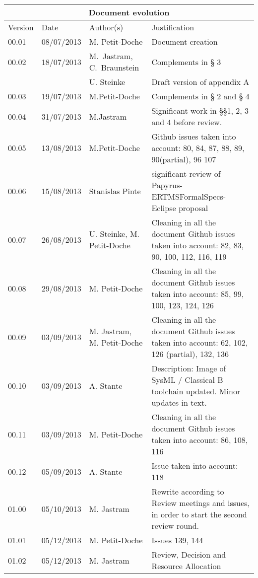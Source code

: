 \documentclass{template/openetcs_report}
\begin{document}
\begin{tabular}{|p{2.2cm}|p{2cm}|p{3cm}|p{5cm}|}
\hline
\multicolumn{4}{|c|}{Document evolution} \\
\hline
Version &  Date & Author(s) & Justification  \\
\hline  
00.01 & 08/07/2013 & M. Petit-Doche &  Document creation  \\
00.02 & 18/07/2013 & M.~Jastram, C.~Braunstein & Complements in § 3 \\
 &  & U. Steinke & Draft version of appendix A \\
00.03 & 19/07/2013 & M.Petit-Doche & Complements in § 2 and § 4 \\
00.04 & 31/07/2013 & M.Jastram & Significant work in §§1, 2, 3 and 4 before review. \\
00.05 & 13/08/2013 & M.Petit-Doche & Github issues taken into account: 80, 84, 87, 88, 89, 90(partial), 96 107 \\
00.06 & 15/08/2013 & Stanislas Pinte & significant review of Papyrus-ERTMSFormalSpecs-Eclipse proposal \\
00.07 & 26/08/2013 & U. Steinke, M. Petit-Doche & Cleaning in all the document Github issues taken into account: 82, 83, 90, 100, 112, 116, 119 \\
00.08 & 29/08/2013 &  M. Petit-Doche & Cleaning in all the document Github issues taken into account: 85, 99, 100, 123, 124, 126 \\
00.09 & 03/09/2013 & M. Jastram,  M. Petit-Doche & Cleaning in all the document Github issues taken into account: 62, 102, 126 (partial), 132, 136 \\
00.10 & 03/09/2013 & A. Stante & Description: Image of SysML / Classical B toolchain updated. Minor updates in text. \\
00.11 & 03/09/2013 &  M. Petit-Doche & Cleaning in all the document Github issues taken into account: 86, 108, 116 \\
00.12 & 05/09/2013 &  A. Stante & Issue taken into account: 118 \\
01.00 & 05/10/2013 &  M. Jastram & Rewrite according to Review meetings and issues, in order to start the second review round. \\
01.01 & 05/12/2013 &  M. Petit-Doche & Issues 139, 144  \\
01.02 & 05/12/2013 &  M. Jastram & Review, Decision and Resource Allocation \\
\hline  
\end{tabular}

\end{document}
